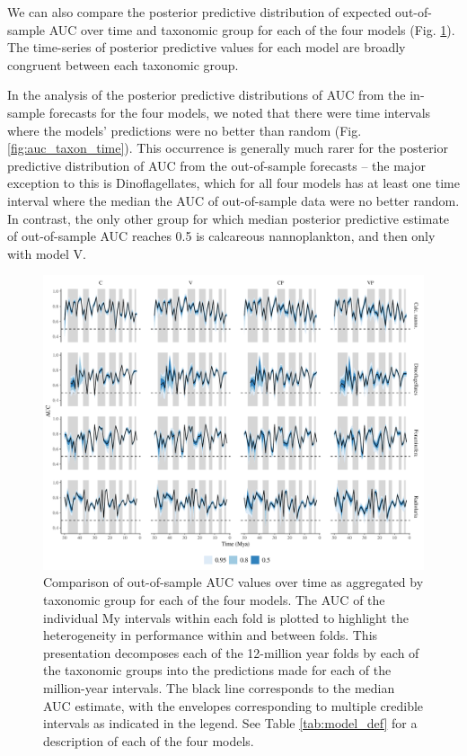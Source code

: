 \documentclass[12pt,letterpaper]{article}
\begin{document}
\begin{refsection}
We can also compare the posterior predictive distribution of expected out-of-sample AUC over time and taxonomic group for each of the four models (Fig. \ref{fig:fold_auc_taxon_time}). The time-series of posterior predictive values for each model are broadly congruent between each taxonomic group. 

In the analysis of the posterior predictive distributions of AUC from the in-sample forecasts for the four models, we noted that there were time intervals where the models' predictions were no better than random (Fig. \ref{fig:auc_taxon_time}). This occurrence is generally much rarer for the posterior predictive distribution of AUC from the out-of-sample forecasts -- the major exception to this is Dinoflagellates, which for all four models has at least one time interval where the median the AUC of out-of-sample data were no better random. In contrast, the only other group for which median posterior predictive estimate of out-of-sample AUC reaches 0.5 is calcareous nannoplankton, and then only with model V.
\begin{figure}[ht]
  \centering
  \includegraphics[width=\textwidth,height=0.5\textheight,keepaspectratio=true]{../results/figure/fold_auc_taxon_time_full}
  \caption{Comparison of out-of-sample AUC values over time as aggregated by taxonomic group for each of the four models. The AUC of the individual My intervals within each fold is plotted to highlight the heterogeneity in performance within and between folds. This presentation decomposes each of the 12-million year folds by each of the taxonomic groups into the predictions made for each of the million-year intervals. The black line corresponds to the median AUC estimate, with the envelopes corresponding to multiple credible intervals as indicated in the legend. See Table \ref{tab:model_def} for a description of each of the four models.}
  \label{fig:fold_auc_taxon_time}
\end{figure}



\end{refsection}
\end{document}

